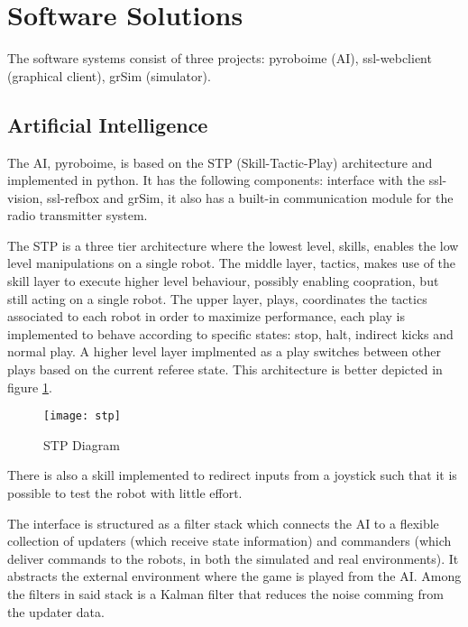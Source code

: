 \section{Software Solutions}\label{soft_sys_sec}

The software systems consist of three projects: pyroboime (AI), ssl-webclient (graphical client), grSim (simulator).

\subsection{Artificial Intelligence}

The AI, pyroboime, is based on the STP (Skill-Tactic-Play) architecture and implemented in python.
It has the following components: interface with the ssl-vision, ssl-refbox and grSim, it also has a built-in communication module for the radio transmitter system.

The STP is a three tier architecture where the lowest level, skills, enables the low level manipulations on a single robot.
The middle layer, tactics, makes use of the skill layer to execute higher level behaviour, possibly enabling coopration, but still acting on a single robot.
The upper layer, plays, coordinates the tactics associated to each robot in order to maximize performance, each play is implemented to behave according to specific states: stop, halt, indirect kicks and normal play.
A higher level layer implmented as a play switches between other plays based on the current referee state.
This architecture is better depicted in figure \ref{STPDiagram}.

\begin{figure}[H]
     \centering
     \texttt{[image: stp]}
     \caption{STP Diagram}
     \label{STPDiagram}
\end{figure}

There is also a skill implemented to redirect inputs from a joystick such that it is possible to test the robot with little effort.

The interface is structured as a filter stack which connects the AI to a flexible collection of updaters (which receive state information) and commanders (which deliver commands to the robots, in both the simulated and real environments).
It abstracts the external environment where the game is played from the AI.
Among the filters in said stack is a Kalman filter that reduces the noise comming from the updater data.


